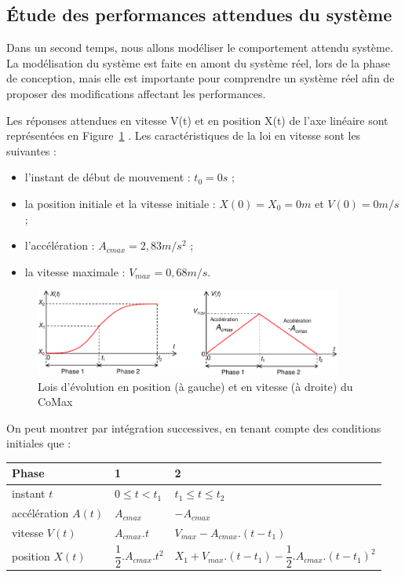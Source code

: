 \documentclass[a4paper,11pt,titlepage]{report}
\begin{document}
\subsection{Étude des performances attendues du système}
Dans un second temps, nous allons modéliser le comportement attendu système. La modélisation du système est faite en amont du système réel, lors de la phase de conception, mais elle est importante pour comprendre un système réel afin de proposer des modifications affectant les performances.

Les réponses attendues en vitesse V(t) et en position X(t) de l’axe linéaire sont représentées en Figure~\ref{lois_horaires} . Les caractéristiques de la loi en vitesse sont les suivantes :
\begin{itemize}
\item l’instant de début de mouvement : $t_0=0 s$ ;
\item la position initiale et la vitesse initiale : $X(0)=X_0=0 m$ et $V(0)=0 m/s$;
\item l’accélération : $A_{cmax}=2,83 m/s^2$ ;
\item la vitesse maximale : $V_{max}=0,68 m/s$.
\end{itemize}

\begin{figure}[!h]
\centering
\includegraphics[width=0.9\textwidth]{image/lois_horaires.pdf}
\caption{Lois d'évolution en position (à gauche) et en vitesse (à droite) du CoMax}
\label{lois_horaires}
\end{figure}

On peut montrer par intégration successives, en tenant compte des conditions initiales que :

\vspace{0.5cm}
\begin{tabular}{|l|l|l|}
    \hline
     \textbf{Phase} &  \textbf{1} & \textbf{2}  \\
    \hline
     instant $t$  & $0\leq t <t_1$ & $t_1 \leq t \leq t_2$ \\
    \hline
     accélération $A(t)$  & $A_{cmax}$ & $-A_{cmax}$ \\
    \hline
     vitesse $V(t)$  & $A_{cmax}.t$ & $V_{max}-A_{cmax}.(t-t_1)$ \\
    \hline
     position $X(t)$  & $\dfrac{1}{2}.A_{cmax}.t^2$ & $X_1 + V_{max}.(t-t_1) - \dfrac{1}{2}.A_{cmax}.(t-t_1)^2$  \\
    \hline
\end{tabular}
\end{document}
